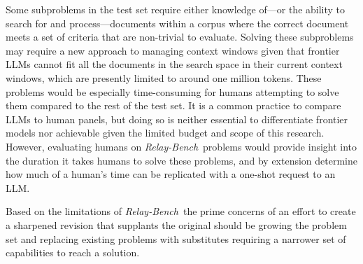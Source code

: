 \documentclass[10pt,letterpaper,twocolumn]{article}
\newcommand{\relaybench}{\texorpdfstring{{\textit{Relay-Bench}}}{Relay-Bench}}
\begin{document}
Some subproblems in the test set require either knowledge of---or the ability to search for and process---documents within a corpus where the correct document meets a set of criteria that are non-trivial to evaluate. Solving these subproblems may require a new approach to managing context windows given that frontier LLMs cannot fit all the documents in the search space in their current context windows, which are presently limited to around one million tokens. These problems would be especially time-consuming for humans attempting to solve them compared to the rest of the test set. It is a common practice to compare LLMs to human panels, but doing so is neither essential to differentiate frontier models nor achievable given the limited budget and scope of this research. However, evaluating humans on \relaybench\ problems would provide insight into the duration it takes humans to solve these problems, and by extension determine how much of a human's time can be replicated with a one-shot request to an LLM.

Based on the limitations of \relaybench\, the prime concerns of an effort to create a sharpened revision that supplants the original should be growing the problem set and replacing existing problems with substitutes requiring a narrower set of capabilities to reach a solution.
\end{document}
